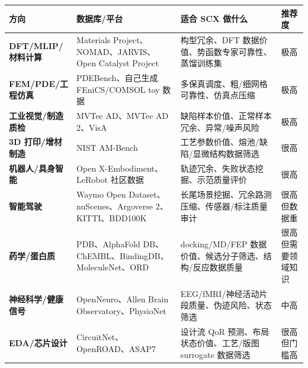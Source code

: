\documentclass[
  12pt,
]{ctexart}
\begin{document}
\begin{longtable}[]{@{}
  >{\raggedright\arraybackslash}p{}
  >{\raggedright\arraybackslash}p{}
  >{\raggedright\arraybackslash}p{}
  >{\raggedright\arraybackslash}p{}@{}}
\toprule\noalign{}
\begin{minipage}[b]{\linewidth}\raggedright
方向
\end{minipage} & \begin{minipage}[b]{\linewidth}\raggedright
数据库/平台
\end{minipage} & \begin{minipage}[b]{\linewidth}\raggedright
适合 SCX 做什么
\end{minipage} & \begin{minipage}[b]{\linewidth}\raggedright
推荐度
\end{minipage} \\
\midrule\noalign{}
\endhead
\bottomrule\noalign{}
\endlastfoot
\textbf{DFT/MLIP/材料计算} & Materials Project、NOMAD、JARVIS、Open
Catalyst Project & 构型冗余、DFT 数据价值、势函数专家可靠性、蒸馏训练集
& 极高 \\
\textbf{FEM/PDE/工程仿真} & PDEBench、自己生成 FEniCS/COMSOL toy 数据 &
多保真调度、粗/细网格可靠性、仿真点压缩 & 极高 \\
\textbf{工业视觉/制造质检} & MVTec AD、MVTec AD 2、VisA &
缺陷样本价值、正常样本冗余、异常/噪声风险 & 极高 \\
\textbf{3D 打印/增材制造} & NIST AM-Bench &
工艺参数价值、熔池/缺陷/显微结构数据筛选 & 很高 \\
\textbf{机器人/具身智能} & Open X-Embodiment、LeRobot 社区数据 &
轨迹冗余、失败状态挖掘、示范质量评价 & 很高 \\
\textbf{智能驾驶} & Waymo Open Dataset、nuScenes、Argoverse
2、KITTI、BDD100K & 长尾场景挖掘、冗余路测压缩、传感器/标注质量审计 &
很高但数据重 \\
\textbf{药学/蛋白质} & PDB、AlphaFold
DB、ChEMBL、BindingDB、MoleculeNet、ORD & docking/MD/FEP
数据价值、候选分子筛选、结构/反应数据质量 & 很高但需要领域知识 \\
\textbf{神经科学/健康信号} & OpenNeuro、Allen Brain
Observatory、PhysioNet & EEG/fMRI/神经活动片段质量、伪迹风险、状态筛选 &
中高 \\
\textbf{EDA/芯片设计} & CircuitNet、OpenROAD、ASAP7 & 设计流 QoR
预测、布局状态价值、工艺/版图 surrogate 数据筛选 & 很高但门槛高 \\
\end{longtable}
\end{document}
